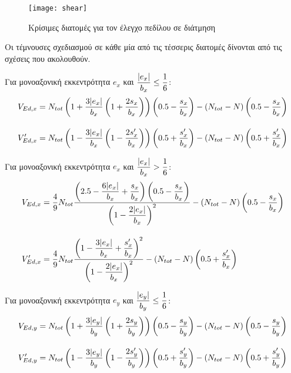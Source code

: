 \begin{figure}[H]
	\centering
	\texttt{[image: shear]}
	\caption{Κρίσιμες διατομές για τον έλεγχο πεδίλου σε διάτμηση}
	\label{fig:shear}
\end{figure}

Οι τέμνουσες σχεδιασμού σε κάθε μία από τις τέσσερις διατομές δίνονται από τις σχέσεις που ακολουθούν.

Για μονοαξονική εκκεντρότητα $e_{x}$ και $\dfrac{\lvert e_x\rvert}{b_x} \leq \dfrac{1}{6}$:
\begin{subequations}
\begin{align}
  V_{Ed,x} & = N_{tot}\left(1 + \dfrac{3\lvert e_x\rvert}{b_x}\left(1 + \dfrac{2s_x}{b_x}\right)\right)\left(0.5 - \dfrac{s_x}{b_x}\right) - \left(N_{tot} - N\right)\left(0.5 - \dfrac{s_x}{b_x}\right) \label{eqn:23a} \\[10pt]
  V'_{Ed,x} & = N_{tot}\left(1 - \dfrac{3\lvert e_x\rvert}{b_x}\left(1 - \dfrac{2s'_x}{b_x}\right)\right)\left(0.5 + \dfrac{s'_x}{b_x}\right) - \left(N_{tot} - N\right)\left(0.5 + \dfrac{s'_x}{b_x}\right) \label{eqn:23b}
\end{align}
\end{subequations}

Για μονοαξονική εκκεντρότητα $e_{x}$ και $\dfrac{\lvert e_x\rvert}{b_x} > \dfrac{1}{6}$:
\begin{subequations}
\begin{align}
  V_{Ed,x} & = \dfrac{4}{9}N_{tot}\dfrac{\left(2.5 - \dfrac{6\lvert e_x\rvert}{b_x} + \dfrac{s_x}{b_x}\right)\left(0.5 - \dfrac{s_x}{b_x}\right)}{\left(1-\dfrac{2\lvert e_x\rvert}{b_x}\right)^2} - \left(N_{tot} - N\right)\left(0.5 - \dfrac{s_x}{b_x}\right) \label{eqn:24a} \\[10pt]
  V'_{Ed,x} & = \dfrac{4}{9}N_{tot}\dfrac{\left(1 - \dfrac{3\lvert e_x\rvert}{b_x} + \dfrac{s'_x}{b_x}\right)^2}{\left(1-\dfrac{2\lvert e_x\rvert}{b_x}\right)^2} - \left(N_{tot} - N\right)\left(0.5 + \dfrac{s'_x}{b_x}\right) \label{eqn:24b}
\end{align}
\end{subequations}

Για μονοαξονική εκκεντρότητα $e_{y}$ και $\dfrac{\lvert e_y\rvert}{b_y} \leq \dfrac{1}{6}$:
\begin{subequations}
\begin{align}
  V_{Ed,y} & = N_{tot}\left(1 + \dfrac{3\lvert e_y\rvert}{b_y}\left(1 + \dfrac{2s_y}{b_y}\right)\right)\left(0.5 - \dfrac{s_y}{b_y}\right) - \left(N_{tot} - N\right)\left(0.5 - \dfrac{s_y}{b_y}\right) \label{eqn:25a} \\[10pt]
  V'_{Ed,y} & = N_{tot}\left(1 - \dfrac{3\lvert e_y\rvert}{b_y}\left(1 - \dfrac{2s'_y}{b_y}\right)\right)\left(0.5 + \dfrac{s'_y}{b_y}\right) - \left(N_{tot} - N\right)\left(0.5 + \dfrac{s'_y}{b_y}\right) \label{eqn:25b}
\end{align}
\end{subequations}

